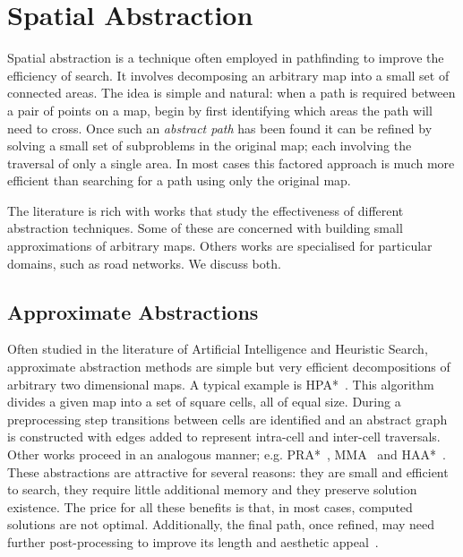 \section{Spatial Abstraction}
\label{cha::lit::abstraction}
Spatial abstraction is a technique often employed in pathfinding to improve the efficiency of
search. It involves decomposing an arbitrary map into a small set of connected areas. The idea is
simple and natural: when a path is required between a pair of points on a map, begin by first
identifying which areas the path will need to cross. Once such an \emph{abstract path} has been
found it can be refined by solving a small set of subproblems in the original map; each involving
the traversal of only a single area. In most cases this factored approach is much more
efficient than searching for a path using only the original map.

The literature is rich with works that study the effectiveness of different abstraction techniques. 
Some of these are concerned with building small approximations of arbitrary maps.  Others works 
are specialised for particular domains, such as road networks. We discuss both.

\subsection{Approximate Abstractions}
Often studied in the literature of Artificial Intelligence and Heuristic Search, approximate
abstraction methods are simple but very efficient decompositions of arbitrary two dimensional maps.
A typical example is HPA*~\citep{botea04}. This algorithm divides a given map into a set of 
square cells, all of equal size. During a preprocessing step transitions between cells are identified
and an abstract graph is constructed with edges added to represent intra-cell and inter-cell traversals.
Other works proceed in an analogous manner; e.g. PRA*~\citep{sturtevant05}, MMA~\citep{sturtevant07}
and HAA*~\citep{harabor08}.  These abstractions are attractive for several reasons: they are small and 
efficient to search, they require little additional memory and they preserve solution existence. 
The price for all these benefits is that, in most cases, computed
solutions are not optimal. Additionally, the final path, once refined, may need further
post-processing to improve its length and aesthetic appeal~\citep{pinter01,botea04}.


